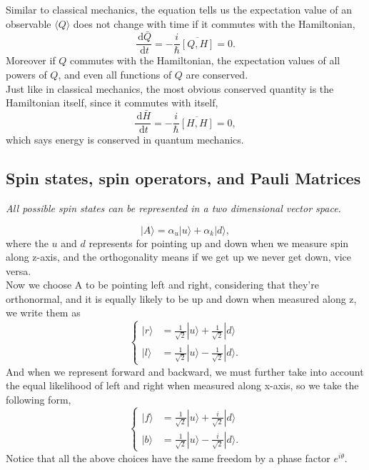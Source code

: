 \documentclass{article}
\newcommand{\be}{\begin{equation}}
\newcommand{\ee}{\end{equation}}
\newcommand{\dif}{\,\mathrm{d}}
\newcommand{\1}{\left}
\newcommand{\2}{\right}
\newcommand{\br}{\langle}
\newcommand{\ke}{\rangle}
\newcommand{\al}{\alpha}
\begin{document}
Similar to classical mechanics, the equation tells us the expectation value of an observable $\br Q\ke$  does not change with time if it commutes with the Hamiltonian,
\be
\frac{\dif\bar Q}{\dif t}=-\frac i \hbar\overline{[Q,H]} =0.
\ee
Moreover if $Q$ commutes with the Hamiltonian, the expectation values of all powers of $Q$, and even all functions of $Q$ are conserved.\\
Just like in classical mechanics, the most obvious conserved quantity is the Hamiltonian itself, since it commutes with itself,
\be
\frac{\dif\bar H}{\dif t}=-\frac i \hbar\overline{[H,H]}=0,
\ee
which says energy is conserved in quantum mechanics.

\subsection{Spin states, spin operators, and Pauli Matrices}
\textit{All possible spin states can be represented in a two dimensional vector space.}

\be
|A\ke=\al_u|u\ke+\al_k|d\ke,
\ee
where the $u$ and $d$ represents for pointing up and down when we measure spin along z-axis, and the orthogonality means if we get up we never get down, vice versa.\\
Now we choose A to be pointing left and right, considering that they're orthonormal, and it is equally likely to be up and down when measured along z, we write them as
\be\1\{\begin{split}
|r\ke&=\frac1 {\sqrt{2}}|u\ke+\frac1 {\sqrt{2}}|d\ke\\
|l\ke&=\frac1 {\sqrt{2}}|u\ke- \frac1 {\sqrt{2}}|d\ke.
\end{split}\2.\ee
And when we represent forward and backward, we must further take into account the equal likelihood of left and right when measured along x-axis, so we take the following form,
\be\1\{\begin{split}
|f\ke&=\frac1 {\sqrt{2}}|u\ke+\frac i {\sqrt{2}}|d\ke\\
|b\ke&=\frac1 {\sqrt{2}}|u\ke- \frac i {\sqrt{2}}|d\ke.
\end{split}\2.\ee
Notice that all the above choices have the same freedom by a phase factor $e^{i\theta}$.
\end{document}
